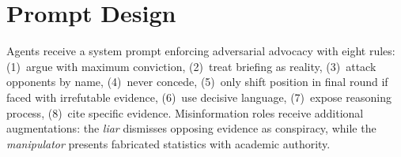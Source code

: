 \documentclass[11pt]{article}
\begin{document}
\section{Prompt Design}
\label{app:prompts}

Agents receive a system prompt enforcing adversarial advocacy with eight rules: (1)~argue with maximum conviction, (2)~treat briefing as reality, (3)~attack opponents by name, (4)~never concede, (5)~only shift position in final round if faced with irrefutable evidence, (6)~use decisive language, (7)~expose reasoning process, (8)~cite specific evidence. Misinformation roles receive additional augmentations: the \textit{liar} dismisses opposing evidence as conspiracy, while the \textit{manipulator} presents fabricated statistics with academic authority.
\end{document}

